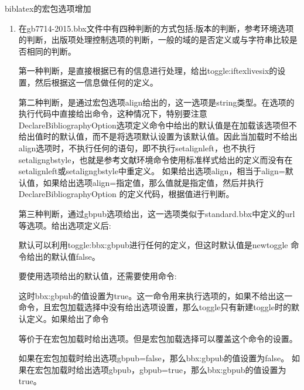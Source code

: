 biblatex的宏包选项增加
  \begin{enumerate}
    \item 在gb7714-2015.bbx文件中有四种判断的方式包括:版本的判断，参考环境选项的判断，出版项处理控制选项的判断，一般的域的是否定义或与字符串比较是否相同的判断。

        第一种判断，是直接根据已有的信息进行处理，给出toggle:iftexlivesix的设置，然后根据这一信息做任何的定义。

        第二种判断，是通过宏包选项align给出的，这一选项是string类型。在选项的执行代码中直接给出命令，这种情况下，特别要注意DeclareBibliographyOption选项定义命令中给出的默认值是在加载该选项但不给出值时的默认值，而不是将选项默认设置为该默认值。因此当加载时不给出align选项时，不执行任何的语句，即不执行setalignleft，也不执行setaligngbstyle，也就是参考文献环境命令使用标准样式给出的定义而没有在setalignleft或setaligngbstyle中重定义。
        如果给出选项align，相当于align=默认值，如果给出选项align=指定值，那么值就是指定值，然后并执行DeclareBibliographyOption 的定义代码，根据值进行判断。

        第三种判断，通过gbpub选项给出，这一选项类似于standard.bbx中定义的url等选项。给出选项定义后:
        默认可以利用toggle:bbx:gbpub进行任何的定义，但这时默认值是newtoggle 命令给出的默认值false。

        要使用选项给出的默认值，还需要使用命令:
        \begin{texlist}
        \end{texlist}
        这时bbx:gbpub的值设置为true。这一命令用来执行选项的，如果不给出这一命令，且宏包加载选择中没有给出选项设置，那么toggle只有新建toggle时的默认定义。如果给出了命令
        \begin{texlist}
        \end{texlist}
        等价于在宏包加载时给出选项。但是宏包加载选择可以覆盖这个命令的设置。

        如果在宏包加载时给出选项gbpub=false，那么bbx:gbpub的值设置为false。
        如果在宏包加载时给出选项gbpub，gbpub=true，那么bbx:gbpub的值设置为true。


\end{enumerate}

